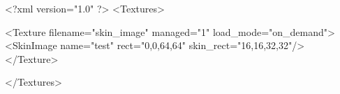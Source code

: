<?xml version="1.0" ?>
<Textures>

	<Texture filename="skin_image" managed="1" load_mode="on_demand">
		<SkinImage name="test" rect="0,0,64,64" skin_rect="16,16,32,32"/>
	</Texture>
	
</Textures>
